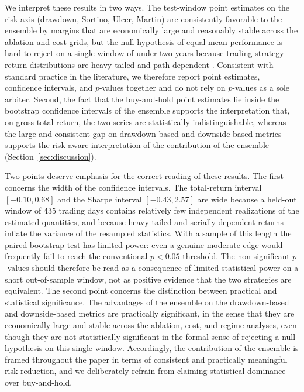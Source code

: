 \documentclass{ieeeaccess}
\newcommand{\TRtestCIlow}{\ensuremath{-0.10}}
\newcommand{\TRtestCIhigh}{\ensuremath{0.68}}
\newcommand{\ShtestCIlow}{\ensuremath{-0.43}}
\newcommand{\ShtestCIhigh}{\ensuremath{2.57}}
\newcommand{\OOSDays}{\ensuremath{435}}
\begin{document}
We interpret these results in two ways. The test-window point estimates on the risk axis (drawdown, Sortino, Ulcer, Martin) are consistently favorable to the ensemble by margins that are economically large and reasonably stable across the ablation and cost grids, but the null hypothesis of equal mean performance is hard to reject on a single window of under two years because trading-strategy return distributions are heavy-tailed and path-dependent \cite{politis1994,bailey2014}. Consistent with standard practice in the literature, we therefore report point estimates, confidence intervals, and $p$-values together and do not rely on $p$-values as a sole arbiter. Second, the fact that the buy-and-hold point estimates lie inside the bootstrap confidence intervals of the ensemble supports the interpretation that, on gross total return, the two series are statistically indistinguishable, whereas the large and consistent gap on drawdown-based and downside-based metrics supports the risk-aware interpretation of the contribution of the ensemble (Section~\ref{sec:discussion}).

Two points deserve emphasis for the correct reading of these results. The first concerns the width of the confidence intervals. The total-return interval $[\TRtestCIlow, \TRtestCIhigh]$ and the Sharpe interval $[\ShtestCIlow, \ShtestCIhigh]$ are wide because a held-out window of \OOSDays{} trading days contains relatively few independent realizations of the estimated quantities, and because heavy-tailed and serially dependent returns inflate the variance of the resampled statistics. With a sample of this length the paired bootstrap test has limited power: even a genuine moderate edge would frequently fail to reach the conventional $p < 0.05$ threshold. The non-significant $p$-values should therefore be read as a consequence of limited statistical power on a short out-of-sample window, not as positive evidence that the two strategies are equivalent. The second point concerns the distinction between practical and statistical significance. The advantages of the ensemble on the drawdown-based and downside-based metrics are practically significant, in the sense that they are economically large and stable across the ablation, cost, and regime analyses, even though they are not statistically significant in the formal sense of rejecting a null hypothesis on this single window. Accordingly, the contribution of the ensemble is framed throughout the paper in terms of consistent and practically meaningful risk reduction, and we deliberately refrain from claiming statistical dominance over buy-and-hold.
\end{document}
